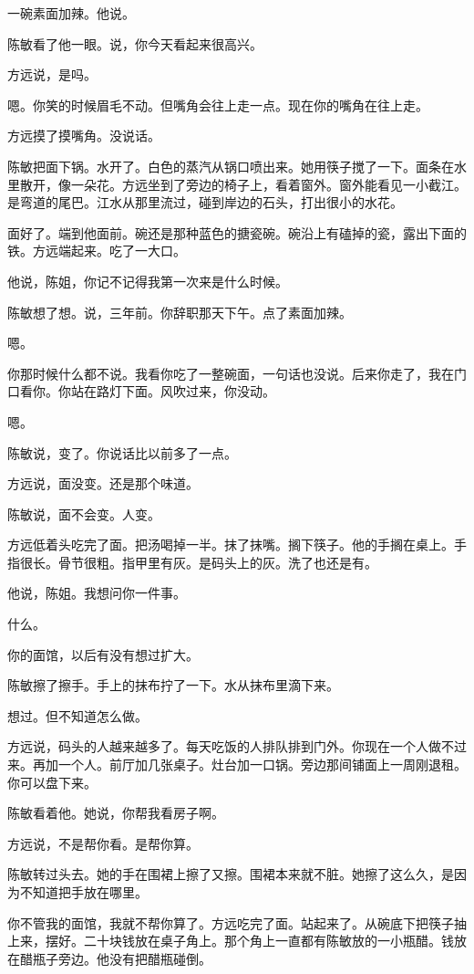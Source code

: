 \documentclass[UTF8,a5paper,11pt,openany]{ctexbook}
\begin{document}
一碗素面加辣。他说。

陈敏看了他一眼。说，你今天看起来很高兴。

方远说，是吗。

嗯。你笑的时候眉毛不动。但嘴角会往上走一点。现在你的嘴角在往上走。

方远摸了摸嘴角。没说话。

陈敏把面下锅。水开了。白色的蒸汽从锅口喷出来。她用筷子搅了一下。面条在水里散开，像一朵花。方远坐到了旁边的椅子上，看着窗外。窗外能看见一小截江。是弯道的尾巴。江水从那里流过，碰到岸边的石头，打出很小的水花。

面好了。端到他面前。碗还是那种蓝色的搪瓷碗。碗沿上有磕掉的瓷，露出下面的铁。方远端起来。吃了一大口。

他说，陈姐，你记不记得我第一次来是什么时候。

陈敏想了想。说，三年前。你辞职那天下午。点了素面加辣。

嗯。

你那时候什么都不说。我看你吃了一整碗面，一句话也没说。后来你走了，我在门口看你。你站在路灯下面。风吹过来，你没动。

嗯。

陈敏说，变了。你说话比以前多了一点。

方远说，面没变。还是那个味道。

陈敏说，面不会变。人变。

方远低着头吃完了面。把汤喝掉一半。抹了抹嘴。搁下筷子。他的手搁在桌上。手指很长。骨节很粗。指甲里有灰。是码头上的灰。洗了也还是有。

他说，陈姐。我想问你一件事。

什么。

你的面馆，以后有没有想过扩大。

陈敏擦了擦手。手上的抹布拧了一下。水从抹布里滴下来。

想过。但不知道怎么做。

方远说，码头的人越来越多了。每天吃饭的人排队排到门外。你现在一个人做不过来。再加一个人。前厅加几张桌子。灶台加一口锅。旁边那间铺面上一周刚退租。你可以盘下来。

陈敏看着他。她说，你帮我看房子啊。

方远说，不是帮你看。是帮你算。

陈敏转过头去。她的手在围裙上擦了又擦。围裙本来就不脏。她擦了这么久，是因为不知道把手放在哪里。

你不管我的面馆，我就不帮你算了。方远吃完了面。站起来了。从碗底下把筷子抽上来，摆好。二十块钱放在桌子角上。那个角上一直都有陈敏放的一小瓶醋。钱放在醋瓶子旁边。他没有把醋瓶碰倒。
\end{document}
